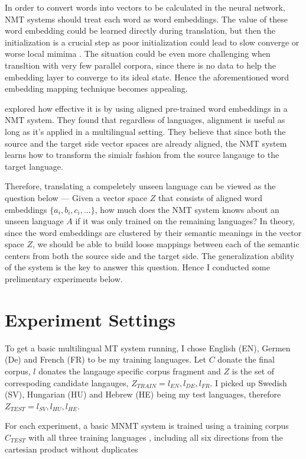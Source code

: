 \documentclass[thesis,fonts=libertine]{cluu}
\begin{document}
In order to convert words into vectors to be calculated in the neural network, NMT systems should treat each word as word embeddings. The value of these word embedding could be learned directly during translation, but then the initialization is a crucial step as poor initialization could lead to slow converge or worse local mimima \parencite{glorot2010understanding}. The situation could be even more challenging when transltion with very few parallel corpora, since there is no data to help the embedding layer to converge to its ideal state. Hence the aforementioned word embedding mapping technique becomes appealing.

\cite{Qi:2018aa} explored how effective it is by using aligned pre-trained word embeddings in a NMT system. They found that regardless of languages, alignment is useful as long as it's applied in a multilingual setting. They believe that since both the source and the target side vector spaces are already aligned, the NMT system learns how to transform the simialr fashion from the source langauge to the target language.

Therefore, translating a compeletely unseen language can be viewed as the question below --- Given a vector space $Z$ that consists of aligned word embeddings $\{a_i, b_i, c_i, ...\}$, how much does the NMT system knows about an unseen language $A$ if it was only trained on the remaining languages? In theory, since the word embeddings are clustered by their semantic meanings in the vector space $Z$, we should be able to build loose mappings between each of the semantic centers from both the source side and the target side. The generalization ability of the system is the key to answer this question. Hence I conducted some prelimentary experiments below.

\section{Experiment Settings}

To get a basic multilingual MT system running, I chose English (EN), Germen (De) and French (FR) to be my training languages. Let $C$ donate the final corpus, $l$ donates the langauge specific corpus fragment and $Z$ is the set of correspoding candidate langauges, $Z_{TRAIN} = {l_{EN}, l_{DE}, l_{FR}}$. I picked up Swedish (SV), Hungarian (HU) and Hebrew (HE) being my test languages, therefore $Z_{TEST} = {l_{SV}, l_{HU}, l_{HE}}$.

For each experiment, a basic MNMT system is trained using a training corpus  $C_{TEST}$ with all three training languages , including all six directions from the cartesian product without duplicates
\end{document}
